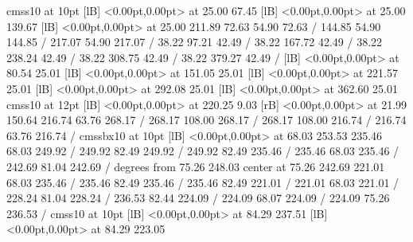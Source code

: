 {\font\picfont cmss10 at 10pt\picfont
{}  [lB] <0.00pt,0.00pt> at 25.00 67.45
  [lB] <0.00pt,0.00pt> at 25.00 139.67
  [lB] <0.00pt,0.00pt> at 25.00 211.89
\setsolid
{} 72.63 54.90 72.63 /
\setsolid
{} 144.85 54.90 144.85 /
\setsolid
{} 217.07 54.90 217.07 /
\setsolid
{} 38.22 97.21 42.49 /
\setsolid
{} 38.22 167.72 42.49 /
\setsolid
{} 38.22 238.24 42.49 /
\setsolid
{} 38.22 308.75 42.49 /
\setsolid
{} 38.22 379.27 42.49 /
  [lB] <0.00pt,0.00pt> at 80.54 25.01
  [lB] <0.00pt,0.00pt> at 151.05 25.01
  [lB] <0.00pt,0.00pt> at 221.57 25.01
  [lB] <0.00pt,0.00pt> at 292.08 25.01
  [lB] <0.00pt,0.00pt> at 362.60 25.01
\font\picfont cmss10 at 12pt\picfont
{}  [lB] <0.00pt,0.00pt> at 220.25 9.03
 [rB] <0.00pt,0.00pt> at 21.99 150.64
\setsolid
{} 216.74 63.76 268.17 /
 268.17 108.00 268.17 /
 268.17 108.00 216.74 /
 216.74 63.76 216.74 /
\font\picfont cmssbx10 at 10pt\picfont
{}  [lB] <0.00pt,0.00pt> at 68.03 253.53
\setsolid
{} 235.46 68.03 249.92 /
 249.92 82.49 249.92 /
 249.92 82.49 235.46 /
 235.46 68.03 235.46 /
\setsolid
{} 242.69 81.04 242.69 /
 degrees from 75.26 248.03 center at 75.26 242.69
\setsolid
{} 221.01 68.03 235.46 /
 235.46 82.49 235.46 /
 235.46 82.49 221.01 /
 221.01 68.03 221.01 /
\setsolid
{} 228.24 81.04 228.24 /
\setsolid
{} 236.53 82.44 224.09 /
 224.09 68.07 224.09 /
 224.09 75.26 236.53 /
\font\picfont cmss10 at 10pt\picfont
{}  [lB] <0.00pt,0.00pt> at 84.29 237.51
  [lB] <0.00pt,0.00pt> at 84.29 223.05
\endpicture
}
